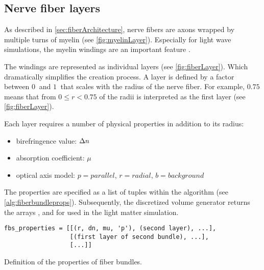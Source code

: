 \subsection{Nerve fiber layers}
%
As described in \cref{sec:fiberArchitecture}, nerve fibers are axons wrapped by multiple turns of myelin (see \cref{fig:myelinLayer}).
Especially for light wave simulations, the myelin windings are an important feature \cite{MenzelDissertation}.
\par
%
The windings are represented as individual layers (see \cref{fig:fiberLayer}).
Which dramatically simplifies the creation process.
A layer is defined by a factor between $\SI{0}{}$ and $\SI{1}{}$ that scales with the radius of the nerve fiber.
For example, $\SI{0.75}{}$ means that from $0 \leq r < 0.75$ of the radii is interpreted as the first layer (see \cref{fig:fiberLayer}).
\par
%
Each layer requires a number of physical properties in addition to its radius:
%
\begin{itemize}[nosep]
    \item birefringence value: $\textnormal{$\Delta n$}$
    \item absorption coefficient: $\mu$
    \item optical axis model: $p=\mathit{parallel}$, $r=\mathit{radial}$, $b=\mathit{background}$
\end{itemize}
%
The properties are specified as a list of tuples within the algorithm (see \cref{alg:fiberbundleprops}).
Subsequently, the discretized volume generator returns the arrays \tissue{}, \opticalaxis{} and \propertylist{} for used in the light matter simulation.
%
\begin{lstfloat}[!ht]
\lstset{style=python}
\begin{lstlisting}[]
fbs_properties = [[(r, dn, mu, 'p'), (second layer), ...],
                  [(first layer of second bundle), ...],
                  [...]]
\end{lstlisting}
\caption[]{Definition of the properties of fiber bundles.}
\label{alg:fiberbundleprops}
\end{lstfloat}
%
%
%
